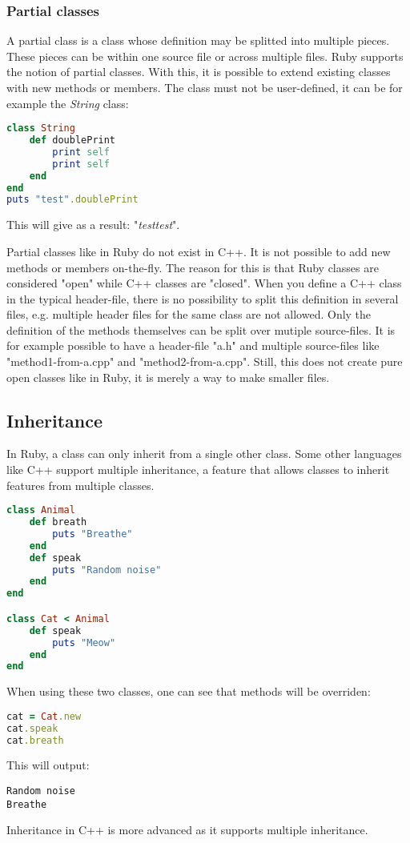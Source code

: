 \documentclass[10pt,a4paper,twocolumn]{article}
\begin{document}
\subsubsection{Partial classes}
A partial class is a class whose definition may be splitted into multiple pieces. These pieces can be within one source file or across multiple files. Ruby supports the notion of partial classes. With this, it is possible to extend existing classes with new methods or members. The class must not be user-defined, it can be for example the \textit{String} class: 

\begin{lstlisting}[language=Ruby]
class String
	def doublePrint
		print self
		print self
	end
end
puts "test".doublePrint
\end{lstlisting}

This will give as a result: "\textit{testtest}".

Partial classes like in Ruby do not exist in C++. It is not possible to add new methods or members on-the-fly. The reason for this is that Ruby classes are considered "open" while C++ classes are "closed". When you define a C++ class in the typical header-file, there is no possibility to split this definition in several files, e.g. multiple header files for the same class are not allowed. Only the definition of the methods themselves can be split over mutiple source-files. It is for example possible to have a header-file "a.h" and multiple source-files like "method1-from-a.cpp" and "method2-from-a.cpp". Still, this does not create pure open classes like in Ruby, it is merely a way to make smaller files.

\subsection{Inheritance}
In Ruby, a class can only inherit from a single other class. Some other languages like C++ support multiple inheritance, a feature that allows classes to inherit features from multiple classes.
\begin{lstlisting}[language=Ruby]
class Animal
	def breath
		puts "Breathe"
	end
	def speak
		puts "Random noise"
	end
end

class Cat < Animal
	def speak
		puts "Meow"
	end
end
\end{lstlisting}
When using these two classes, one can see that methods will be overriden:
\begin{lstlisting}[language=Ruby]
cat = Cat.new
cat.speak
cat.breath
\end{lstlisting}
This will output:
\begin{lstlisting}
Random noise
Breathe
\end{lstlisting}
Inheritance in C++ is more advanced as it supports multiple inheritance.
\end{document}
